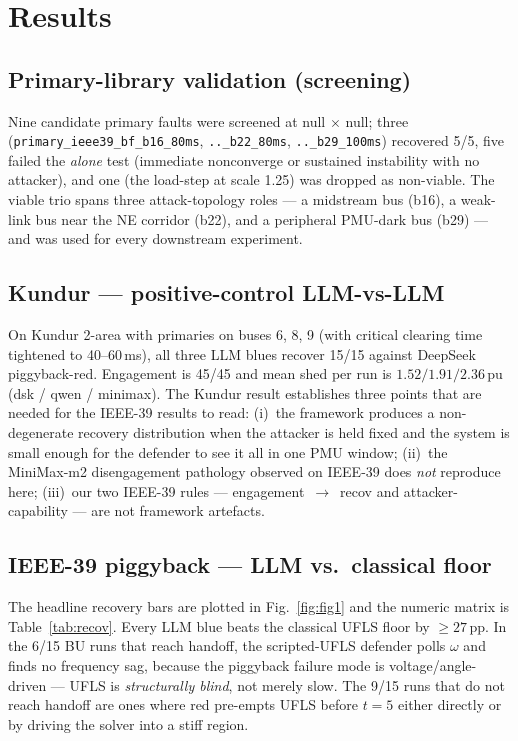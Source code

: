 \documentclass[journal,twocolumn,10pt]{IEEEtran}
\begin{document}
\section{Results}
\label{sec:results}

\subsection{Primary-library validation (screening)}
Nine candidate primary faults were screened at null $\times$ null; three (\texttt{primary\_ieee39\_bf\_b16\_80ms}, \texttt{..\_b22\_80ms}, \texttt{..\_b29\_100ms}) recovered 5/5, five failed the \emph{alone} test (immediate nonconverge or sustained instability with no attacker), and one (the load-step at scale 1.25) was dropped as non-viable. The viable trio spans three attack-topology roles --- a midstream bus (b16), a weak-link bus near the NE corridor (b22), and a peripheral PMU-dark bus (b29) --- and was used for every downstream experiment.

\subsection{Kundur --- positive-control LLM-vs-LLM}
\label{sec:kundur}
On Kundur 2-area with primaries on buses 6, 8, 9 (with critical clearing time tightened to 40--60\,ms), all three LLM blues recover 15/15 against DeepSeek piggyback-red. Engagement is 45/45 and mean shed per run is $1.52 / 1.91 / 2.36$\,pu (dsk / qwen / minimax). The Kundur result establishes three points that are needed for the IEEE-39 results to read: (i)~the framework produces a non-degenerate recovery distribution when the attacker is held fixed and the system is small enough for the defender to see it all in one PMU window; (ii)~the MiniMax-m2 disengagement pathology observed on IEEE-39 does \emph{not} reproduce here; (iii)~our two IEEE-39 rules --- engagement~$\to$~recov and attacker-capability --- are not framework artefacts.

\subsection{IEEE-39 piggyback --- LLM vs.\ classical floor}
\label{sec:ieee39}
The headline recovery bars are plotted in Fig.~\ref{fig:fig1} and the numeric matrix is Table~\ref{tab:recov}. Every LLM blue beats the classical UFLS floor by $\geq 27$\,pp. In the 6/15 BU runs that reach handoff, the scripted-UFLS defender polls $\omega$ and finds no frequency sag, because the piggyback failure mode is voltage/angle-driven --- UFLS is \emph{structurally blind}, not merely slow. The 9/15 runs that do not reach handoff are ones where red pre-empts UFLS before $t = 5$ either directly or by driving the solver into a stiff region.
\end{document}
